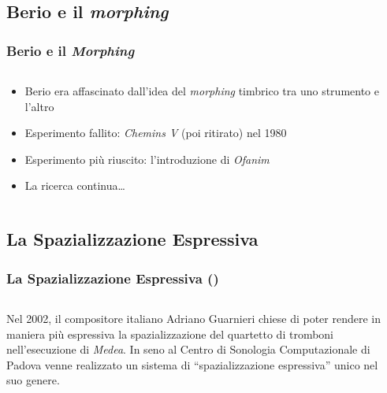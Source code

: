 \documentclass[compress]{beamer}
\begin{document}
\subsection[Morphing]{Berio e il {\it morphing}}

\begin{frame}
    \frametitle{Berio e il \emph{Morphing}}

    \begin{columns}[T]
        \begin{column}{0.7\textwidth}
            \begin{itemize}
                \item Berio era affascinato dall'idea del \emph{morphing}
                    timbrico tra uno strumento e l'altro
                \item Esperimento fallito: \emph{Chemins V} (poi ritirato) nel 1980
                \item Esperimento pi\`u riuscito: l'introduzione di \emph{Ofanim}
                \item La ricerca continua\dots
            \end{itemize}
        \end{column}
        \begin{column}{0.3\textwidth}
        \end{column}
    \end{columns}

\end{frame}

\subsection[Spazializzazione]{La Spazializzazione Espressiva}

\setcounter{ms}{0}

\begin{frame}
    \frametitle{La Spazializzazione Espressiva ()}

    \begin{columns}[T]
        \begin{column}{0.7\textwidth}
            Nel 2002, il compositore italiano Adriano Guarnieri chiese di
            poter rendere in maniera pi\`u espressiva la spazializzazione del
            quartetto di tromboni nell'esecuzione di \emph{Medea}.
            In seno al Centro di Sonologia Computazionale di Padova venne
            realizzato un sistema di ``spazializzazione espressiva'' unico nel
            suo genere.
        \end{column}
        \begin{column}{0.3\textwidth}
        \end{column}
    \end{columns}
    
\end{frame}
\end{document}

